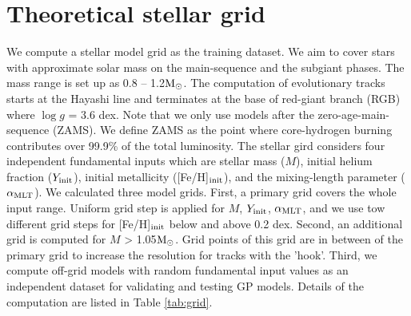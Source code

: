 \section{Theoretical stellar grid}\label{sec:grid}

We compute a stellar model grid as the training dataset. We aim to cover stars with approximate solar mass on the main-sequence and the subgiant phases. The mass range is set up as 0.8 -- 1.2$\rm M_{\odot}$. The computation of evolutionary tracks starts at the Hayashi line and terminates at the base of red-giant branch (RGB) where $\log g$ = 3.6 dex. Note that we only use models after the zero-age-main-sequence (ZAMS). We define ZAMS as the point where core-hydrogen burning contributes over 99.9\% of the total luminosity. 
%
The stellar gird considers four independent fundamental inputs which are stellar mass ($M$), initial helium fraction ($Y_{\rm init}$), initial metallicity ([Fe/H]$_{\rm init}$), and the mixing-length parameter ($\alpha_{\rm MLT}$). 
%
We calculated three model grids. First, a primary grid covers the whole input range. Uniform grid step is applied for $M$, $Y_{\rm init}$, $\alpha_{\rm MLT}$, and we use tow different grid steps for [Fe/H]$_{\rm init}$ below and above 0.2 dex.  Second, an additional grid is computed for $M$ > 1.05$\rm M_{\odot}$. Grid points of this grid are in between of the primary grid to increase the resolution for tracks with the 'hook'. 
Third, we compute off-grid models with random fundamental input values as an independent dataset for validating and testing GP models. 
%
Details of the computation are listed in Table \ref{tab:grid}. 

